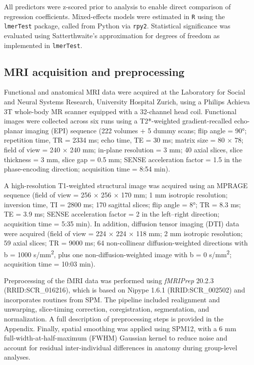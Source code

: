 \documentclass{article}
\begin{document}
All predictors were z-scored prior to analysis to enable direct comparison of regression coefficients. Mixed-effects models were estimated in \texttt{R} using the \texttt{lmerTest} package, called from Python via \texttt{rpy2}. Statistical significance was evaluated using Satterthwaite’s approximation for degrees of freedom as implemented in \texttt{lmerTest}.


\subsection*{MRI acquisition and preprocessing}

Functional and anatomical MRI data were acquired at the Laboratory for Social and Neural Systems Research, University Hospital Zurich, using a Philips Achieva 3T whole-body MR scanner equipped with a 32-channel head coil. Functional images were collected across six runs using a T2*-weighted gradient-recalled echo-planar imaging (EPI) sequence (222 volumes + 5 dummy scans; flip angle = 90°; repetition time, TR = 2334 ms; echo time, TE = 30 ms; matrix size = 80 × 78; field of view = 240 × 240 mm; in-plane resolution = 3 mm; 40 axial slices, slice thickness = 3 mm, slice gap = 0.5 mm; SENSE acceleration factor = 1.5 in the phase-encoding direction; acquisition time = 8:54 min). 

A high-resolution T1-weighted structural image was acquired using an MPRAGE sequence (field of view = 256 × 256 × 170 mm; 1 mm isotropic resolution; inversion time, TI = 2800 ms; 170 sagittal slices; flip angle = 8°; TR = 8.3 ms; TE = 3.9 ms; SENSE acceleration factor = 2 in the left–right direction; acquisition time = 5:35 min). In addition, diffusion tensor imaging (DTI) data were acquired (field of view = 224 × 224 × 118 mm; 2 mm isotropic resolution; 59 axial slices; TR = 9000 ms; 64 non-collinear diffusion-weighted directions with b = 1000 s/mm\textsuperscript{2}, plus one non-diffusion-weighted image with b = 0 s/mm\textsuperscript{2}; acquisition time = 10:03 min).

Preprocessing of the fMRI data was performed using \textit{fMRIPrep} 20.2.3 \cite{esteban2019fmriprep} (RRID:SCR\_016216), which is based on Nipype 1.6.1 \cite{gorgolewski2011nipype} (RRID:SCR\_002502) and incorporates routines from SPM. The pipeline included realignment and unwarping, slice-timing correction, coregistration, segmentation, and normalization. A full description of preprocessing steps is provided in the Appendix. Finally, spatial smoothing was applied using SPM12, with a 6 mm full-width-at-half-maximum (FWHM) Gaussian kernel to reduce noise and account for residual inter-individual differences in anatomy during group-level analyses.
\end{document}
